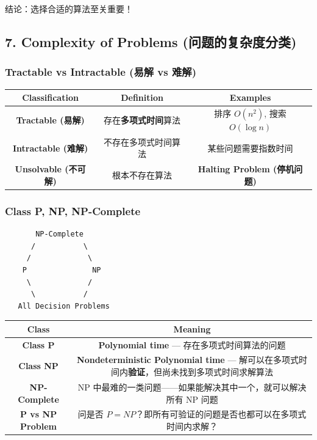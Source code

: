 \documentclass[10pt,a4paper,openany]{ctexbook}
\theoremstyle{definition}
\theoremstyle{remark}
\renewenvironment{quote}
  {\list{}{\leftmargin=1em\rightmargin=0pt\topsep=0.5pt\partopsep=0pt}\item[]}
  {\endlist}
\begin{document}
\begin{quote}
结论：选择合适的算法至关重要！

\end{quote}
\vspace{-2pt}

\subsection{7. Complexity of Problems (问题的复杂度分类)}

\subsubsection{Tractable vs Intractable (易解 vs 难解)}

\begin{center}
\begin{tabular}{ccc}
\hline
Classification & Definition & Examples \\ \hline
\textbf{Tractable (易解)} & 存在\textbf{多项式时间}算法 & 排序 $O(n^2)$, 搜索 $O(\log n)$ \\
\textbf{Intractable (难解)} & 不存在多项式时间算法 & 某些问题需要指数时间 \\
\textbf{Unsolvable (不可解)} & 根本不存在算法 & \textbf{Halting Problem (停机问题)} \\
\hline
\end{tabular}

\end{center}

\subsubsection{Class P, NP, NP-Complete}

{\footnotesize\begin{verbatim}
       NP-Complete
      /           \
     /             \
    P               NP
     \             /
      \           /
   All Decision Problems
\end{verbatim}}

\begin{center}
\begin{tabular}{cc}
\hline
Class & Meaning \\ \hline
\textbf{Class P} & \textbf{Polynomial time} — 存在多项式时间算法的问题 \\
\textbf{Class NP} & \textbf{Nondeterministic Polynomial time} — 解可以在多项式时间内\textbf{验证}，但尚未找到多项式时间求解算法 \\
\textbf{NP-Complete} & NP 中最难的一类问题——如果能解决其中一个，就可以解决所有 NP 问题 \\
\textbf{P vs NP Problem} & 问是否 $P = NP$？即所有可验证的问题是否也都可以在多项式时间内求解？ \\
\hline
\end{tabular}

\end{center}
\end{document}
